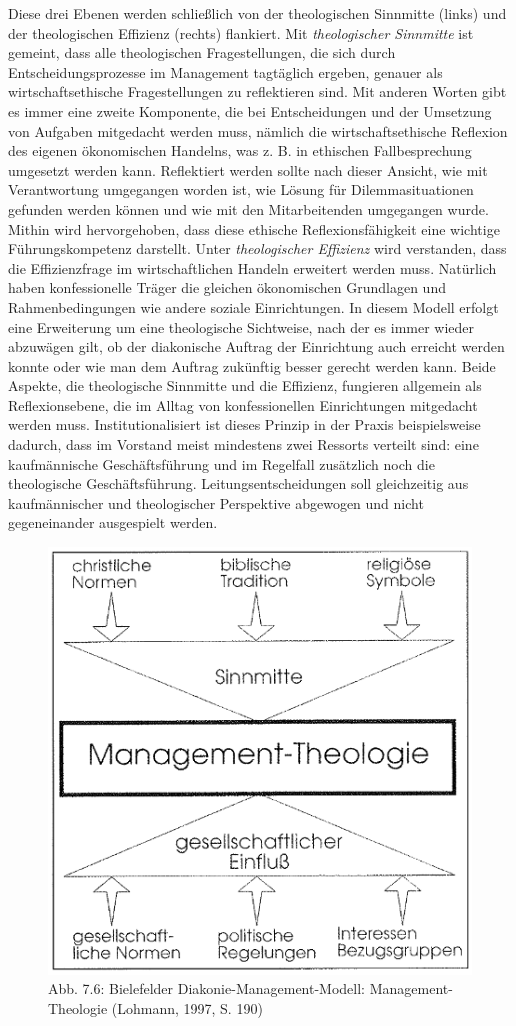 \documentclass[
  letterpaper,
]{book}
\begin{document}
Diese drei Ebenen werden schließlich von der theologischen Sinnmitte
(links) und der theologischen Effizienz (rechts) flankiert. Mit
\emph{theologischer Sinnmitte} ist gemeint, dass alle theologischen
Fragestellungen, die sich durch Entscheidungsprozesse im Management
tagtäglich ergeben, genauer als wirtschaftsethische Fragestellungen zu
reflektieren sind. Mit anderen Worten gibt es immer eine zweite
Komponente, die bei Entscheidungen und der Umsetzung von Aufgaben
mitgedacht werden muss, nämlich die wirtschaftsethische Reflexion des
eigenen ökonomischen Handelns, was z. B. in ethischen Fallbesprechung
umgesetzt werden kann. Reflektiert werden sollte nach dieser Ansicht,
wie mit Verantwortung umgegangen worden ist, wie Lösung für
Dilemmasituationen gefunden werden können und wie mit den Mitarbeitenden
umgegangen wurde. Mithin wird hervorgehoben, dass diese ethische
Reflexionsfähigkeit eine wichtige Führungskompetenz darstellt. Unter
\emph{theologischer Effizienz} wird verstanden, dass die Effizienzfrage
im wirtschaftlichen Handeln erweitert werden muss. Natürlich haben
konfessionelle Träger die gleichen ökonomischen Grundlagen und
Rahmenbedingungen wie andere soziale Einrichtungen. In diesem Modell
erfolgt eine Erweiterung um eine theologische Sichtweise, nach der es
immer wieder abzuwägen gilt, ob der diakonische Auftrag der Einrichtung
auch erreicht werden konnte oder wie man dem Auftrag zukünftig besser
gerecht werden kann. Beide Aspekte, die theologische Sinnmitte und die
Effizienz, fungieren allgemein als Reflexionsebene, die im Alltag von
konfessionellen Einrichtungen mitgedacht werden muss.
Institutionalisiert ist dieses Prinzip in der Praxis beispielsweise
dadurch, dass im Vorstand meist mindestens zwei Ressorts verteilt sind:
eine kaufmännische Geschäftsführung und im Regelfall zusätzlich noch die
theologische Geschäftsführung. Leitungsentscheidungen soll gleichzeitig
aus kaufmännischer und theologischer Perspektive abgewogen und nicht
gegeneinander ausgespielt werden.

\begin{figure}

\includegraphics[width=0.6\linewidth,height=\textheight,keepaspectratio]{images/figure76.png} \hfill{}

\caption{Abb. 7.6: Bielefelder Diakonie-Management-Modell:
Management-Theologie (Lohmann, 1997, S. 190)}

\end{figure}%
\end{document}
